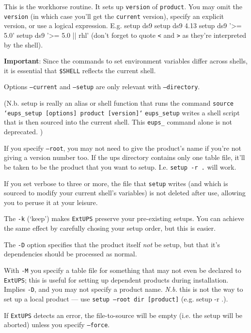 \documentclass{article}
\newcommand{\code}[1]{\texttt{#1}}
\newcommand{\eups}{\code{ExtUPS}\xspace}
\let\overbatim=\verbatim
\let\oendverbatim=\endverbatim
\renewenvironment{verbatim}
{\center\minipage{16cm}\overbatim}
{\oendverbatim\endminipage\endcenter}
\begin{document}
This is the workhorse routine. It sets up \code{version} of \code{product}. You
may omit the \code{version} (in which case you'll get the \code{current} version),
specify an explicit version, or use a logical expression. E.g.
\begin{verbatim}
  setup ds9
  setup ds9 4.13
  setup ds9 '>= 5.0'
  setup ds9 '>= 5.0 || rhl'
\end{verbatim}
(don't forget to quote \code{<} and \code{>} as they're interpreted by the shell).

\textbf{Important}: Since the commands to set environment variables differ across shells,
it is essential that \code{\$SHELL} reflects the current shell.

Options \code{--current} and \code{--setup} are only relevant with \code{--directory}.

(N.b. setup is really an alias or shell function that runs the command\hfil\break
\code{source `eups\_setup [options] product [version]`}\hfil\break
\code{eups\_setup} writes a shell script that is then sourced into the
current shell.  This \code{eups\_} command alone is not deprecated.
)

If you specify \code{--root}, you may not need to give the
product's name if you're not giving a version number too.
If the ups directory contains only one
table file, it'll be taken to be the product that you
want to setup.  I.e. \code{setup -r .} will work.

If you set verbose to three or more, the file that \code{setup} writes (and
which is sourced to modify your current shell's variables) is not deleted
after use, allowing you to peruse it at your leisure.

The \code{-k} (`keep') makes \eups preserve your pre-existing setups.
You can achieve the same effect
by carefully chosing your setup order, but this is easier.

The \code{-D} option specifies that the product itself \textit{not} be
setup, but that it's dependencies should be processed as normal.

With \code{-M} you specify a table file for something that may not
even be declared to \eups; this is useful for setting up dependent
products during installation.  Implies \code{-D}, and you may not
specify a product name. \emph{N.b.} this is not the way to set up
a local product --- use \code{setup --root dir [product]} (e.g. setup -r .).

If \eups detects an error, the file-to-source will be empty (i.e.
the setup will be aborted) unless you specify \code{--force}.
\end{document}
